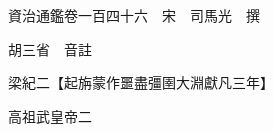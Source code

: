 










 


 
 


 

  
  
  
  
  





  
  
  
  
  
 
  

  

  
  
  



  

 
 

  
   




  

  
  


  　　資治通鑑卷一百四十六　宋　司馬光　撰

　　胡三省　音註

　　梁紀二【起旃蒙作噩盡彊圉大淵獻凡三年】

　　高祖武皇帝二

